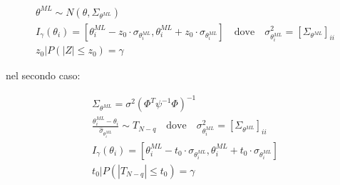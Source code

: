 \begin{gather*}
    \theta^{ML}\sim N(\theta,\Sigma_{\theta^{ML}})\\
    I_\gamma(\theta_i)=\left[ \theta_i^{ML} - z_0\cdot\sigma_{\theta_i^{ML}}  ,  \theta_i^{ML} + z_0\cdot\sigma_{\theta_i^{ML}}\right]\quad \text{dove} \quad \sigma_{\theta_i^{ML}}^2 = \left[ \Sigma_{\theta^{ML}}\right]_{ii}\\
    z_0 | P(\left| Z \right| \leq z_0 ) =\gamma
\end{gather*}

nel secondo caso:

\begin{gather*}
  \Sigma_{\theta^{ML}}=\sigma^2(\Phi^T\psi^{-1}\Phi)^{-1}\\
  \frac{\theta_i^{ML}-\theta_i}{\hat{\sigma}_{\theta_i^{ML}}} \sim T_{N-q}\quad\text{dove}\quad\sigma_{\theta_i^{ML}}^2 = \left[ \Sigma_{\theta^{ML}}\right]_{ii}\\
  I_\gamma(\theta_i)=\left[ \theta_i^{ML} - t_0\cdot\sigma_{\theta_i^{ML}}  ,  \theta_i^{ML} + t_0\cdot\sigma_{\theta_i^{ML}}\right]\\
  t_0 | P(\left| T_{N-q} \right| \leq t_0 ) =\gamma
\end{gather*}

